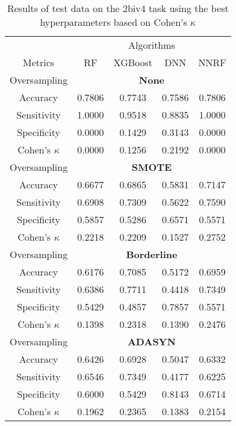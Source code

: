 \begin{table}[!htb]
\centering
\caption{Results of test data on the 2biv4 task using the best hyperparameters based on Cohen's $\kappa$}
\label{tab:2biv4_test_results}
\begin{tabular}{c | c c c c}
\hline
 & \multicolumn{4}{c}{Algorithms}\\ 
Metrics &RF & XGBoost & DNN & NNRF\\ 
\hline
Oversampling &\multicolumn{4}{|c}{\textbf{None}}\\ 
\hline
Accuracy & 0.7806 & 0.7743 & 0.7586 & 0.7806\\ 
Sensitivity & 1.0000 & 0.9518 & 0.8835 & 1.0000\\ 
Specificity & 0.0000 & 0.1429 & 0.3143 & 0.0000\\ 
Cohen's $\kappa$ & 0.0000 & 0.1256 & 0.2192 & 0.0000\\ 
\hline
Oversampling &\multicolumn{4}{|c}{\textbf{SMOTE}}\\ 
\hline
Accuracy & 0.6677 & 0.6865 & 0.5831 & 0.7147\\ 
Sensitivity & 0.6908 & 0.7309 & 0.5622 & 0.7590\\ 
Specificity & 0.5857 & 0.5286 & 0.6571 & 0.5571\\ 
Cohen's $\kappa$ & 0.2218 & 0.2209 & 0.1527 & 0.2752\\ 
\hline
Oversampling &\multicolumn{4}{|c}{\textbf{Borderline}}\\ 
\hline
Accuracy & 0.6176 & 0.7085 & 0.5172 & 0.6959\\ 
Sensitivity & 0.6386 & 0.7711 & 0.4418 & 0.7349\\ 
Specificity & 0.5429 & 0.4857 & 0.7857 & 0.5571\\ 
Cohen's $\kappa$ & 0.1398 & 0.2318 & 0.1390 & 0.2476\\ 
\hline
Oversampling &\multicolumn{4}{|c}{\textbf{ADASYN}}\\ 
\hline
Accuracy & 0.6426 & 0.6928 & 0.5047 & 0.6332\\ 
Sensitivity & 0.6546 & 0.7349 & 0.4177 & 0.6225\\ 
Specificity & 0.6000 & 0.5429 & 0.8143 & 0.6714\\ 
Cohen's $\kappa$ & 0.1962 & 0.2365 & 0.1383 & 0.2154\\ 
\hline
\end{tabular}
\end{table}


